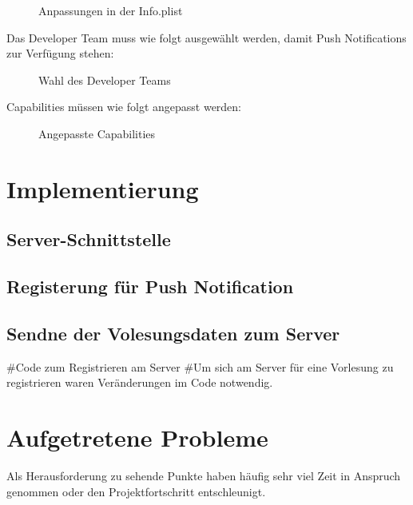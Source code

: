 \begin{figure}[H]
	\centering
	\caption{Anpassungen in der Info.plist}
	\label{plist}
\end{figure}


Das Developer Team muss wie folgt ausgewählt werden, damit Push Notifications zur Verfügung stehen:
\begin{figure}[H]
	\centering
	\caption{Wahl des Developer Teams}
	\label{devteam}
\end{figure}


Capabilities müssen wie folgt angepasst werden:

\begin{figure}[H]
	\centering
	\caption{Angepasste Capabilities}
	\label{capabilities}
\end{figure}

\section{Implementierung}
\subsection{Server-Schnittstelle}
\subsection{Registerung für Push Notification}
\subsection{Sendne der Volesungsdaten zum Server}

	#Code zum Registrieren am Server
	#Um sich am Server für eine Vorlesung zu registrieren waren Veränderungen im Code notwendig.
	

\section{Aufgetretene Probleme}
Als Herausforderung zu sehende Punkte haben häufig sehr viel Zeit in Anspruch genommen oder den Projektfortschritt entschleunigt.


